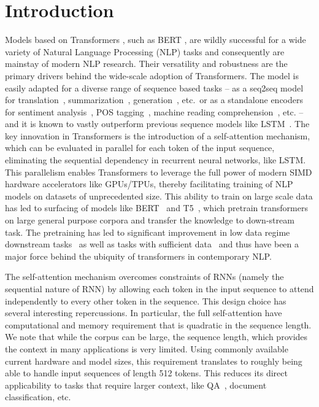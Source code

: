 \section{Introduction}
Models based on Transformers \citep{vaswani2017attention}, such as BERT \citep{devlin2018bert,liu2019roberta}, 
are wildly successful for a wide variety of Natural Language Processing (NLP) tasks and consequently are mainstay of modern NLP research. 
Their versatility and robustness are the primary drivers behind the wide-scale adoption of Transformers. 
The model is easily adapted for a diverse range of sequence based tasks -- as a seq2seq model for translation~\citep{vaswani2017attention}, summarization~\citep{miller2019leveraging}, generation~\citep{chen2019distilling}, etc.~or as a standalone encoders for sentiment analysis~\citep{sun2019utilizing}, POS tagging~\citep{martin2019camembert}, machine reading comprehension~\citep{wang2019multi}, etc. -- and it is known to vastly outperform previous 
sequence models like LSTM~\citep{hochreiter1997long}.
The key innovation in Transformers is the introduction of a self-attention mechanism, which can be evaluated in parallel for each token of the input sequence, eliminating the sequential dependency in recurrent neural networks, like LSTM.
This parallelism enables Transformers to leverage the full power of modern SIMD hardware accelerators like GPUs/TPUs, thereby facilitating training of NLP models on datasets of unprecedented size.
This ability to train on large scale data has led to surfacing of models like BERT~\citep{devlin2018bert} and T5~\citep{raffel2019exploring}, which pretrain transformers on large general purpose corpora and transfer the knowledge to down-stream task. The pretraining has led to significant improvement in low data regime downstream tasks~\citep{kumar2020data} as well as tasks with sufficient data~\citep{yang2019xlnet} and thus have been a major force behind the ubiquity of transformers in contemporary NLP.

The self-attention mechanism  overcomes  constraints of RNNs (namely the sequential nature of RNN)
by allowing each token in the input sequence to attend independently to every other token 
in the sequence.    This design choice has several interesting repercussions.
In particular, the full self-attention have computational and memory requirement that 
is quadratic in the sequence length. We note that while the corpus can be large, the sequence length, which provides the context in many applications is very limited. 
Using commonly available current hardware and model sizes, this 
requirement translates to roughly being able to handle input sequences of length 512 tokens. 
This reduces its direct applicability to tasks that require larger context, 
like QA~\citep{lin2003makes}, document classification, etc.


